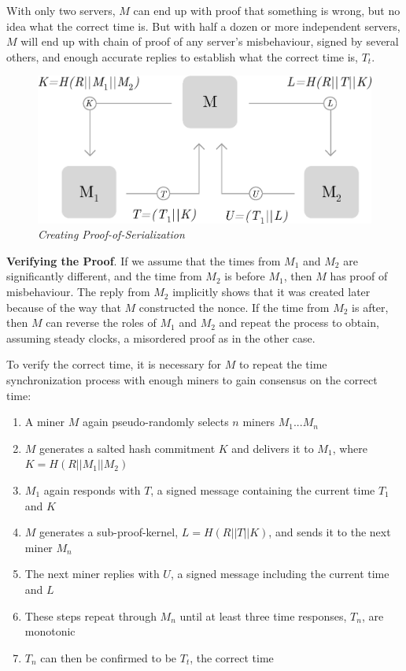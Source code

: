 \documentclass[UTF8, 10pt, nonatbib, nocopyrightspace, reprint]{sigplanconf}
\begin{document}
With only two servers, $M$ can end up with proof that something is wrong, but no idea what the correct time is. But with half a dozen or more independent servers, $M$ will end up with chain of proof of any server's misbehaviour, signed by several others, and enough accurate replies to establish what the correct time is, $T_t$.

\begin{figure}[ht]
    \begin{center}
          \includegraphics[width=\columnwidth]{serialization.eps}
          \caption{\emph{Creating Proof-of-Serialization}}
          \label{fig:serialization}
     \end{center}
\end{figure}

\textbf{Verifying the Proof}. If we assume that the times from $M_1$ and $M_2$ are significantly different, and the time from $M_2$ is before $M_1$, then $M$ has proof of misbehaviour. The reply from $M_2$ implicitly shows that it was created later because of the way that $M$ constructed the nonce. If the time from $M_2$ is after, then $M$ can reverse the roles of $M_1$ and $M_2$ and repeat the process to obtain, assuming steady clocks, a misordered proof as in the other case.

To verify the correct time, it is necessary for $M$ to repeat the time synchronization process with enough miners to gain consensus on the correct time:

\begin{enumerate}
    \item A miner $M$ again pseudo-randomly selects $n$ miners $M_1$...$M_n$
    \item $M$ generates a salted hash commitment $K$ and delivers it to $M_1$, where ${K = H\left(R || M_1 || M_2\right)}$
    \item $M_1$ again responds with $T$, a signed message containing the current time $T_1$ and $K$
    \item $M$ generates a sub-proof-kernel, $L = H\left(R || T || K\right)$, and sends it to the next miner $M_n$
    \item The next miner replies with $U$, a signed message including the current time and $L$
    \item These steps repeat through $M_n$ until at least three time responses, $T_n$, are monotonic
    \item $T_n$ can then be confirmed to be $T_t$, the correct time
\end{enumerate}
\end{document}
